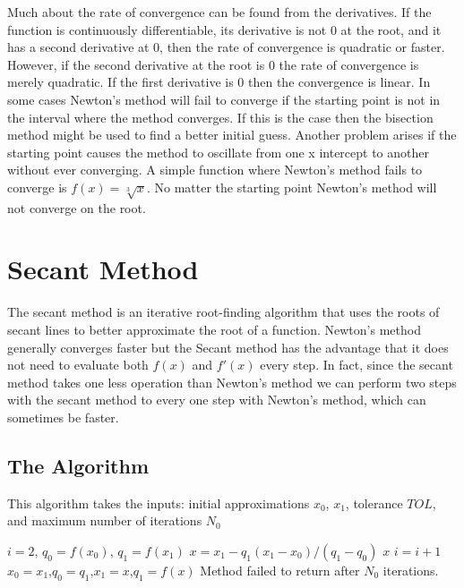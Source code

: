 \documentclass[12pt,oneside]{amsart}
\begin{document}
Much about the rate of convergence can be found from the derivatives. If the function is continuously differentiable, its derivative is not 0 at the root, and it has a second derivative at 0, then the rate of convergence is quadratic or faster. However, if the second derivative at the root is 0 the rate of convergence is merely quadratic. If the first derivative is 0 then the convergence is linear. In some cases Newton's method will fail to converge if the starting point is not in the interval where the method converges. If this is the case then the bisection method might be used to find a better initial guess. Another problem arises if the starting point causes the method to oscillate from one x intercept to another without ever converging. A simple function where Newton's method fails to converge is $f(x) = \sqrt[3]{x}$. No matter the starting point Newton's method will not converge on the root.

\section{Secant Method}\label{sec:secantMethod}
The secant method is an iterative root-finding algorithm that uses the roots of secant lines to better approximate the root of a function. Newton's method generally converges faster but the Secant method has the advantage that it does not need to evaluate both $f(x)$ and $f'(x)$ every step. In fact, since the secant method takes one less operation than Newton's method we can perform two steps with the secant method to every one step with Newton's method, which can sometimes be faster.

\subsection{The Algorithm}
This algorithm takes the inputs: initial approximations $x_0$, $x_1$, tolerance $TOL$, and maximum number of iterations $N_0$
\begin{algorithm}
   \STATE $i = 2$, $q_0 = f(x_0)$, $q_1 = f(x_1)$
      \STATE $x = x_1 - q_1(x_1 - x_0)/(q_1-q_0)$
         \RETURN $x$
      \ENDIF
      \STATE $i = i+1$
      \STATE $x_0 = x_1$,$q_0 = q_1$,$x_1 = x$,$q_1 = f(x)$
   \ENDWHILE
   \PRINT Method failed to return after $N_0$ iterations.
\end{algorithm}
\end{document}
